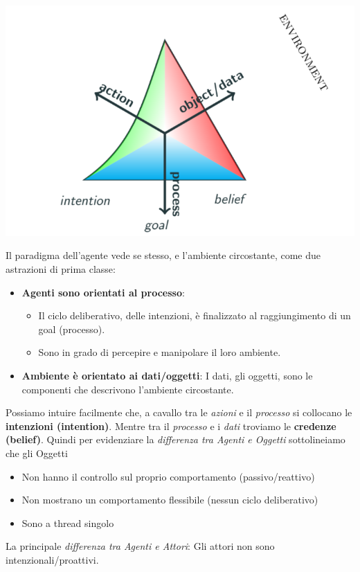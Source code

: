 \begin{center}
    \includegraphics[scale=0.4]{images/triangolo di meyer AOP.PNG}
\end{center}
Il paradigma dell'agente vede se stesso, e l'ambiente circostante, come due astrazioni di prima classe:
\begin{itemize}
    \item \textbf{Agenti sono orientati al processo}:
        \begin{itemize}
            \item Il ciclo deliberativo, delle intenzioni, è finalizzato al raggiungimento di un goal (processo).
            \item Sono in grado di percepire e manipolare il loro ambiente.
        \end{itemize}
    \item \textbf{Ambiente è orientato ai dati/oggetti}: I dati, gli oggetti, sono le componenti che descrivono l'ambiente circostante.
\end{itemize}
Possiamo intuire facilmente che, a cavallo tra le \textit{azioni} e il \textit{processo} si collocano le \textbf{intenzioni (intention)}. Mentre tra il \textit{processo} e i \textit{dati} troviamo le \textbf{credenze (belief)}. 
Quindi per evidenziare la \textit{differenza tra Agenti e Oggetti} sottolineiamo che gli Oggetti
\begin{itemize}
    \item Non hanno il controllo sul proprio comportamento (passivo/reattivo)
    \item Non mostrano un comportamento flessibile (nessun ciclo deliberativo)
    \item Sono a thread singolo
\end{itemize}
La principale \textit{differenza tra Agenti e Attori}: Gli attori non sono intenzionali/proattivi.

